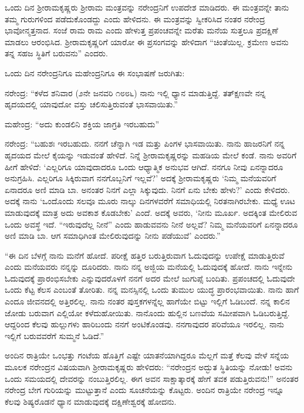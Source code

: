 ಒಂದು ದಿನ ಶ‍್ರೀರಾಮಕೃಷ್ಣರು ಶ‍್ರೀರಾಮ ಮಂತ್ರವನ್ನು ನರೇಂದ್ರನಿಗೆ ಉಪದೇಶ ಮಾಡಿದರು. ಈ ಮಂತ್ರವನ್ನೇ ತಾನು ತಮ್ಮ ಗುರುಗಳಿಂದ ಪಡೆದುಕೊಂಡದ್ದು ಎಂದು ಹೇಳಿದನು. ಈ ಮಂತ್ರವನ್ನು ಸ್ವೀಕರಿಸಿದ ನಂತರ ನರೇಂದ್ರ ಭಾವೋನ್ಮತ್ತನಾದ. ಸಂಜೆ ರಾಮ ರಾಮ ಎಂದು ಹೇಳುತ್ತ ಪ್ರಪಂಚವನ್ನೇ ಮರೆತು ಮನೆಯ ಸುತ್ತಲೂ ಪ್ರದಕ್ಷಿಣೆ ಮಾಡಲು ಆರಂಭಿಸಿದ. ಶ‍್ರೀರಾಮಕೃಷ್ಣರಿಗೆ ಯಾರೋ ಈ ಪ್ರಸಂಗವನ್ನು ಹೇಳಿದಾಗ “ಚಿಂತೆಯಿಲ್ಲ. ಕ್ರಮೇಣ ಅವನು ತನ್ನ ಸಹಜ ಸ್ಥಿತಿಗೆ ಬರುವನು” ಎಂದರು.

ಒಂದು ದಿನ ನರೇಂದ್ರನಿಗೂ ಮಹೇಂದ್ರನಿಗೂ ಈ ಸಂಭಾಷಣೆ ಜರುಗಿತು:

ನರೇಂದ್ರ: “ಕಳೆದ ಶನಿವಾರ (೨ನೇ ಜನವರಿ ೧೮೮೬) ನಾನು ಇಲ್ಲಿ ಧ್ಯಾನ ಮಾಡುತ್ತಿದ್ದೆ. ತತ್‍ಕ್ಷಣವೇ ನನ್ನ ಹೃದಯದಲ್ಲಿ ಯಾವುದೋ ವಸ್ತು ಚಲಿಸುತ್ತಿರುವಂತೆ ಭಾಸವಾಯಿತು.”

ಮಹೇಂದ್ರ: “ಅದು ಕುಂಡಲಿನಿ ಶಕ್ತಿಯ ಜಾಗ್ರತಿ ಇರಬಹುದು”

ನರೇಂದ್ರ: “ಬಹುಶಃ ಇರಬಹುದು. ನನಗೆ ಚೆನ್ನಾಗಿ ಇಡ ಮತ್ತು ಪಿಂಗಳ ಭಾಸವಾಯಿತು. ನಾನು ಹಾಜರನಿಗೆ ನನ್ನ ಹೃದಯದ ಮೇಲೆ ಕೈಯನ್ನು ಇಡುವಂತೆ ಹೇಳಿದೆ. ನಿನ್ನೆ ಶ‍್ರೀರಾಮಕೃಷ್ಣರನ್ನು ಮಹಡಿಯ ಮೇಲೆ ಕಂಡೆ. ನಾನು ಅವರಿಗೆ ಹೀಗೆ ಹೇಳಿದೆ: ‘ಎಲ್ಲರಿಗೂ ಯಾವುದಾದರೂ ಒಂದು ಆಧ್ಯಾತ್ಮಿಕ ಅನುಭವ ಆಗಿದೆ. ನನಗೂ ನೀವು ಏನನ್ನಾದರೂ ಅನುಗ್ರಹಿಸಿ. ಎಲ್ಲರಿಗೂ ಸಿಕ್ಕಿರುವಾಗ ನನಗೊಬ್ಬನಿಗೆ ಇಲ್ಲವೆ?’ ಅದಕ್ಕೆ ಶ‍್ರೀರಾಮಕೃಷ್ಣರು ‘ನಿಮ್ಮ ಮನೆಯವರಿಗೆ ಏನಾದರೂ ಅಣಿ ಮಾಡಿ ಬಾ. ಅನಂತರ ನಿನಗೆ ಎಲ್ಲಾ ಸಿಕ್ಕುವುದು. ನಿನಗೆ ಏನು ಬೇಕು ಹೇಳು?’ ಎಂದು ಕೇಳಿದರು. ಅದಕ್ಕೆ ನಾನು ‘ಒಂದೊಂದು ಸಲವೂ ಮೂರು ನಾಲ್ಕು ದಿನಗಳವರೆಗೆ ಸಮಾಧಿಯಲ್ಲಿ ನಿರತನಾಗಿರಬೇಕು. ಮಧ್ಯೆ ಊಟ ಮಾಡುವುದಕ್ಕೆ ಮಾತ್ರ ಅದು ಅವಕಾಶ ಕೊಡಬೇಕು’ ಎಂದೆ. ಅದಕ್ಕೆ ಅವರು, ‘ನೀನು ಮೂರ್ಖ. ಅದಕ್ಕಿಂತ ಮೇಲಿರುವ ಒಂದು ಅವಸ್ಥೆ ಇದೆ. “ಇರುವುದೆಲ್ಲ ನೀನೆ” ಎಂದು ಹಾಡುವವನು ನೀನೆ ಅಲ್ಲವೆ? ನಿಮ್ಮ ಮನೆಯವರಿಗೆ ಏನನ್ನಾದರೂ ಅಣಿ ಮಾಡಿ ಬಾ. ಆಗ ಸಮಾಧಿಗಿಂತ ಮೇಲಿರುವುದನ್ನು ನೀನು ಪಡೆಯುವೆ’ ಎಂದರು.”

“ಈ ದಿನ ಬೆಳಗ್ಗೆ ನಾನು ಮನೆಗೆ ಹೋದೆ. ಪರೀಕ್ಷೆ ಹತ್ತಿರ ಬರುತ್ತಿರುವಾಗ ಓದುವುದನ್ನು ಉಪೇಕ್ಷೆ ಮಾಡುತ್ತಿರುವೆ ಎಂದು ಮನೆಯವರು ನನ್ನನ್ನು ದೂರಿದರು. ನಾನು ನನ್ನ ಅಜ್ಜಿಯ ಮನೆಯಲ್ಲಿ ಓದುವುದಕ್ಕೆ ಹೋದೆ. ನಾನು ಇನ್ನೇನು ಓದುವುದಕ್ಕೆ ಪ್ರಾರಂಭಿಸಬೇಕು ಎನ್ನುವುದರೊಳಗೆ ನನಗೆ ಅದರ ಮೇಲೆ ಜುಗುಪ್ಸೆ ಬಂದಿತು. ಪ್ರಪಂಚದಲ್ಲಿ ಓದುವುದೇ ಒಂದು ಕೆಟ್ಟ ಕೆಲಸ ಎಂಬಂತೆ ತೋರಿತು. ನನ್ನ ಮನಸ್ಸಿನಲ್ಲಿ ಒಂದು ತುಮುಲ ಯುದ್ಧ ಪ್ರಾರಂಭವಾಯಿತು. ನಾನು ಹಾಗೆ ಎಂದೂ ಜೀವನದಲ್ಲಿ ಅತ್ತಿರಲಿಲ್ಲ. ನಾನು ನಂತರ ಪುಸ್ತಕಗಳನ್ನೆಲ್ಲ ಹಾಗೆಯೇ ಬಿಟ್ಟು ಇಲ್ಲಿಗೆ ಓಡಿಬಂದೆ. ನನ್ನ ಕಾಲಿನ ಜೋಡು ಬರುವಾಗ ಎಲ್ಲಿಯೋ ಕಳೆದುಹೋಯಿತು. ನಾನೊಂದು ಹುಲ್ಲಿನ ಬಣವೆಯ ಸಮೀಪವಾಗಿ ಓಡಿಬರುತ್ತಿದ್ದೆ. ಆದ್ದರಿಂದ ಕೆಲವು ಹುಲ್ಲುಗಳು ಹಾರಿಬಂದು ನನಗೆ ಅಂಟಿಕೊಂಡವು. ನನಗಾವುದರ ಪರಿವೆಯೂ ಇರಲಿಲ್ಲ. ನಾನು ಇಲ್ಲಿಗೆ ಬರುವವರೆಗೆ ಸುಮ್ಮನೆ ಓಡಿದೆ.”

ಅಂದಿನ ರಾತ್ರಿಯೇ ಒಂಭತ್ತು ಗಂಟೆಯ ಹೊತ್ತಿಗೆ ಎಷ್ಟೇ ಯಾತನೆಯಾಗಿದ್ದರೂ ಮೆಲ್ಲಗೆ ಮತ್ತೆ ಕೆಲವು ವೇಳೆ ಸನ್ನೆಯ ಮೂಲಕ ನರೇಂದ್ರನ ವಿಷಯವಾಗಿ ಶ‍್ರೀರಾಮಕೃಷ್ಣರು ಹೇಳಿದರು: “ನರೇಂದ್ರನ ಅದ್ಭುತ ಸ್ಥಿತಿಯನ್ನು ನೋಡು! ಅವನು ಒಂದು ಸಮಯದಲ್ಲಿ ದೇವರನ್ನು ನಂಬುತ್ತಿರಲಿಲ್ಲ. ಈಗ ಅವನ ಸಾಕ್ಷಾತ್ಕಾರಕ್ಕೆ ಹೇಗೆ ತವಕ ಪಡುತ್ತಿರುವನು!” ಅನಂತರ ನರೇಂದ್ರ ಬೇಗ ಗುರಿಯನ್ನು ಮುಟ್ಟುತ್ತಾನೆ ಎಂದು ಸೂಚನೆಯನ್ನು ಕೊಟ್ಟರು. ಅಂದಿನ ರಾತ್ರಿಯೇ ನರೇಂದ್ರ ಇನ್ನೂ ಕೆಲವು ಶಿಷ್ಯರೊಡನೆ ಧ್ಯಾನ ಮಾಡುವುದಕ್ಕೆ ದಕ್ಷಿಣೇಶ್ವರಕ್ಕೆ ಹೋದನು.

